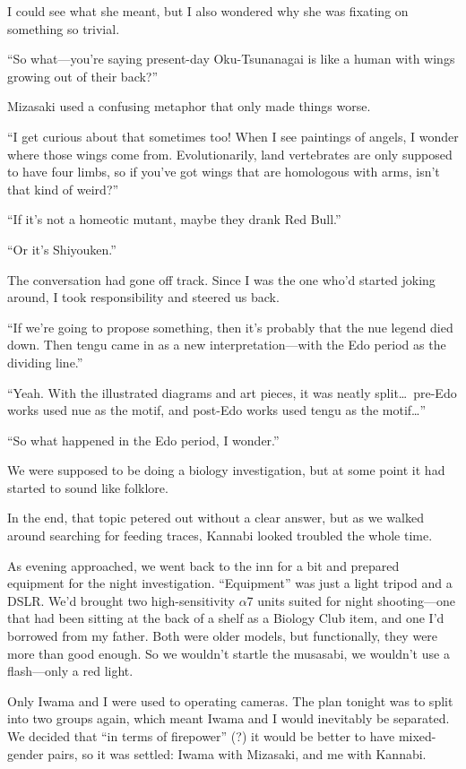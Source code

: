 \documentclass[
    a4paper,
    12pt,
    twoside,
    openany,
    UTF8,
    fontset=windows
]{ctexbook}
\begin{document}
I could see what she meant, but I also wondered why she was fixating on something so trivial.

``So what---you're saying present-day Oku-Tsunanagai is like a human with wings growing out of their back?''

Mizasaki used a confusing metaphor that only made things worse.

``I get curious about that sometimes too! When I see paintings of angels, I wonder where those wings come from. Evolutionarily, land vertebrates are only supposed to have four limbs, so if you've got wings that are homologous with arms, isn't that kind of weird?''

``If it's not a homeotic mutant, maybe they drank Red Bull.''

``Or it's Shiyouken.''

The conversation had gone off track. Since I was the one who'd started joking around, I took responsibility and steered us back.

``If we're going to propose something, then it's probably that the nue legend died down. Then tengu came in as a new interpretation---with the Edo period as the dividing line.''

``Yeah. With the illustrated diagrams and art pieces, it was neatly split\dots\ pre-Edo works used nue as the motif, and post-Edo works used tengu as the motif\dots''

``So what happened in the Edo period, I wonder.''

We were supposed to be doing a biology investigation, but at some point it had started to sound like folklore.

In the end, that topic petered out without a clear answer, but as we walked around searching for feeding traces, Kannabi looked troubled the whole time.

As evening approached, we went back to the inn for a bit and prepared equipment for the night investigation. ``Equipment'' was just a light tripod and a DSLR. We'd brought two high-sensitivity $\alpha$7 units suited for night shooting---one that had been sitting at the back of a shelf as a Biology Club item, and one I'd borrowed from my father. Both were older models, but functionally, they were more than good enough. So we wouldn't startle the musasabi, we wouldn't use a flash---only a red light.

Only Iwama and I were used to operating cameras. The plan tonight was to split into two groups again, which meant Iwama and I would inevitably be separated. We decided that ``in terms of firepower'' (?) it would be better to have mixed-gender pairs, so it was settled: Iwama with Mizasaki, and me with Kannabi.
\end{document}
